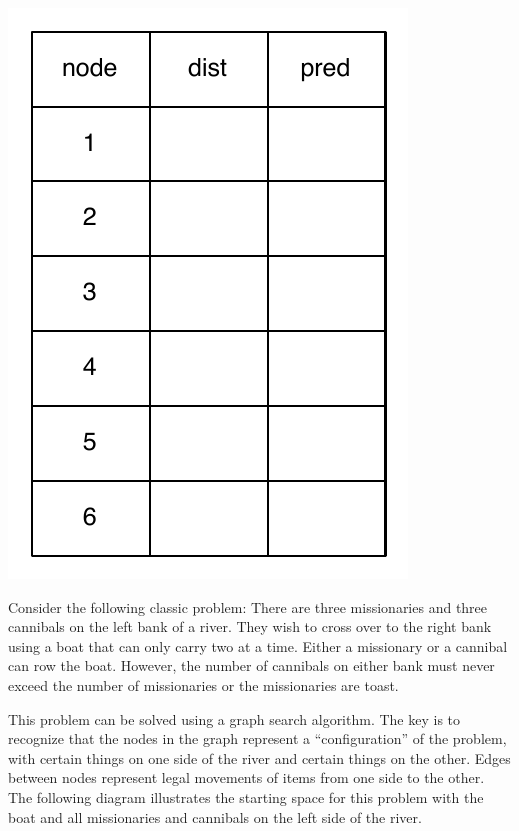\documentclass[11pt]{exam}
\begin{document}
\begin{questions}
\begin{parts}
\includegraphics[scale=0.9]{dijkstra_table}
\end{parts}



\newpage
\question  Consider the following classic problem:  There are three missionaries and three cannibals on the left bank of a river.  They wish to cross over to the right bank using a boat that can only carry two at a time.  Either a missionary or a cannibal can row the boat.  However, the number of cannibals on either bank must never exceed the number of missionaries or the missionaries are toast.

This problem can be solved using a graph search algorithm.  The key is to recognize that the nodes in the graph represent a ``configuration'' of the problem, with certain things on one side of the river and certain things on the other.  Edges between nodes represent legal movements of items from one side to the other.   The following diagram illustrates the starting space for this problem with the boat and all missionaries and cannibals on the left side of the river.


\end{questions}
\end{document}
